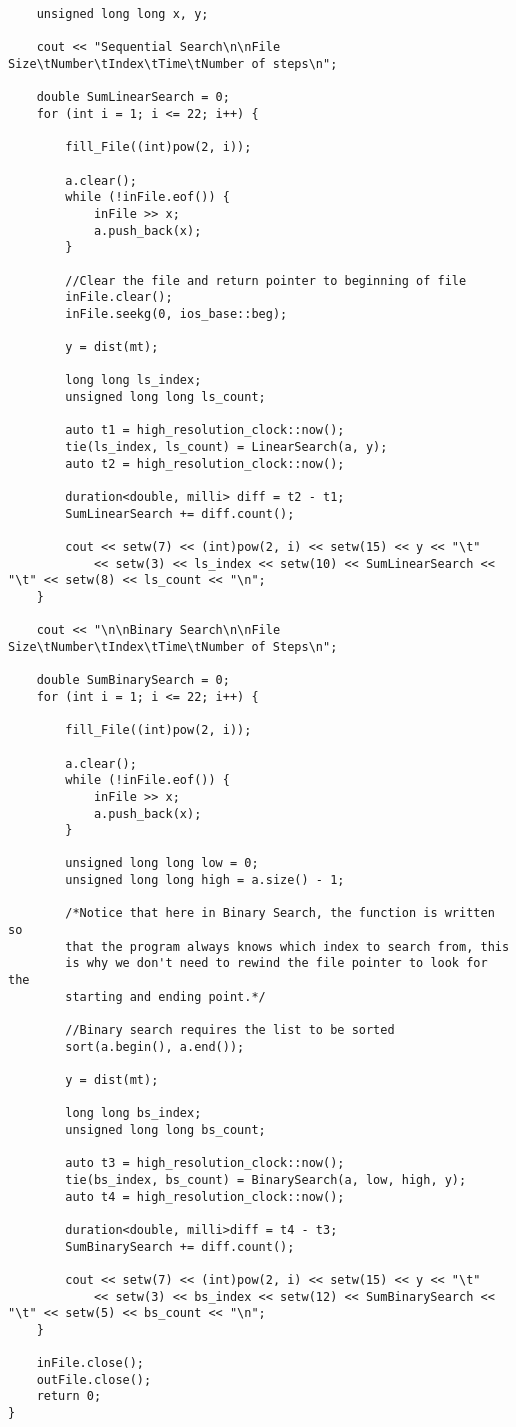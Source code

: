 \documentclass[a4paper, 12pt]{article}
\begin{document}
\begin{lstlisting}
	unsigned long long x, y;

	cout << "Sequential Search\n\nFile Size\tNumber\tIndex\tTime\tNumber of steps\n";

	double SumLinearSearch = 0;
	for (int i = 1; i <= 22; i++) {

		fill_File((int)pow(2, i));

		a.clear();
		while (!inFile.eof()) {
			inFile >> x;
			a.push_back(x);
		}

		//Clear the file and return pointer to beginning of file
		inFile.clear();
		inFile.seekg(0, ios_base::beg);

		y = dist(mt);

		long long ls_index;
		unsigned long long ls_count;

		auto t1 = high_resolution_clock::now();
		tie(ls_index, ls_count) = LinearSearch(a, y);
		auto t2 = high_resolution_clock::now();

		duration<double, milli> diff = t2 - t1;
		SumLinearSearch += diff.count();

		cout << setw(7) << (int)pow(2, i) << setw(15) << y << "\t"
			<< setw(3) << ls_index << setw(10) << SumLinearSearch << "\t" << setw(8) << ls_count << "\n";
	}

	cout << "\n\nBinary Search\n\nFile Size\tNumber\tIndex\tTime\tNumber of Steps\n";

	double SumBinarySearch = 0;
	for (int i = 1; i <= 22; i++) {

		fill_File((int)pow(2, i));

		a.clear();
		while (!inFile.eof()) {
			inFile >> x;
			a.push_back(x);
		}

		unsigned long long low = 0;
		unsigned long long high = a.size() - 1;

		/*Notice that here in Binary Search, the function is written so
		that the program always knows which index to search from, this
		is why we don't need to rewind the file pointer to look for the
		starting and ending point.*/

		//Binary search requires the list to be sorted
		sort(a.begin(), a.end());

		y = dist(mt);

		long long bs_index;
		unsigned long long bs_count;

		auto t3 = high_resolution_clock::now();
		tie(bs_index, bs_count) = BinarySearch(a, low, high, y);
		auto t4 = high_resolution_clock::now();

		duration<double, milli>diff = t4 - t3;
		SumBinarySearch += diff.count();

		cout << setw(7) << (int)pow(2, i) << setw(15) << y << "\t"
			<< setw(3) << bs_index << setw(12) << SumBinarySearch << "\t" << setw(5) << bs_count << "\n";
	}

	inFile.close();
	outFile.close();
	return 0;
}
	\end{lstlisting}
	
\end{document}
